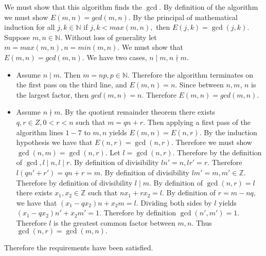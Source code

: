 \documentclass[12pt, letterpaper]{article}
\newcommand{\Z}{\mathbb{Z}}
\newcommand{\N}{\mathbb{N}}
\begin{document}
	We must show that this algorithm finds the $\gcd$.  By definition of the algorithm we must show $E(m,n) = gcd(m,n).$    By the principal of mathematical induction for all $j,k \in \N$ if $j,k < max(m,n),$ then $E(j,k) = \gcd(j,k).$  Suppose $m,n\in \N$.  Without loss of generality let $m = max(m,n), n = min(m,n).$  We must show that $E(m,n) = gcd(m,n).$  We have two cases, $n \mid m, n \nmid m.$
	\begin{itemize}
		\item Assume $n \mid m.$  Then $m = np, p \in \N.$  Therefore the algorithm terminates on the first pass on the third line, and $E(m,n) = n$.  Since between $n,m$, $n$ is the largest factor, then $gcd(m,n) = n.$  Therefore $E(m,n) = gcd(m,n).$
		\item Assume $n \nmid m.$  By the quotient remainder theorem there exists $q,r \in Z, 0 < r < n$ such that $m = qn + r.$  Then applying a first pass of the algorithm lines $1-7$ to $m,n$ yields $E(m,n) = E(n,r)$.  By the induction hypothesis we have that $E(n,r) = \gcd(n,r).$  Therefore we must show $\gcd(n,m) = \gcd(n,r).$  Let $l = \gcd(n,r).$  Therefore by the definition of $\gcd, l \mid n, l \mid r.$  By definition of divisibility $l n' = n, l r' = r.$  Therefore $l(qn' + r') = qn + r = m.$  By definition of divisibility $l m' = m, m' \in \Z.$  Therefore by definition of divisibility $l \mid m.$  By definition of $\gcd(n,r)=l$ there exists $x_1, x_2 \in \Z$ such that $n x_1 + r x_2 = l.$  By definition of $r = m - nq,$ we have that $(x_1 - qx_2)n + x_2 m = l.$  Dividing both sides by $l$ yields $(x_1 - qx_2)n' + x_2 m' = 1.$  Therefore by definition $\gcd(n',m') = 1.$  Therefore $l$ is the greatest common factor between $m,n.$  Thus $\gcd(n,r) = \gcd(m,n).$   
	\end{itemize}
	Therefore the requirements have been satisfied.  
\end{document}
